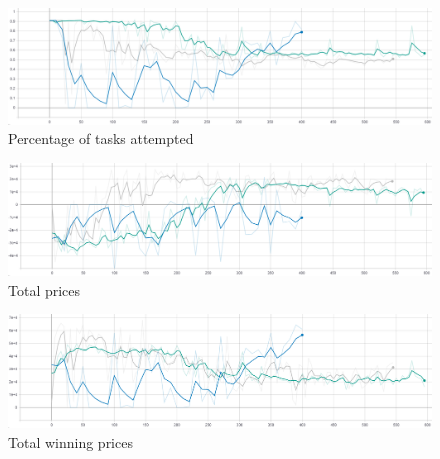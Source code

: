 \begin{figure}[h]
    \centering
    \includegraphics[width=17cm]{figures/4_test_eval_figs/env_training_fig/percent_tasks.png}
    \caption{Percentage of tasks attempted}
    \label{fig:env_percent_tasks}
\end{figure}

\begin{figure}[h]
    \centering
    \includegraphics[width=17cm]{figures/4_test_eval_figs/env_training_fig/total_prices.png}
    \caption{Total prices}
    \label{fig:env_total_prices}
\end{figure}

\begin{figure}[h]
    \centering
    \includegraphics[width=17cm]{figures/4_test_eval_figs/env_training_fig/total_winning_prices.PNG}
    \caption{Total winning prices}
    \label{fig:env_winning_prices}
\end{figure}


